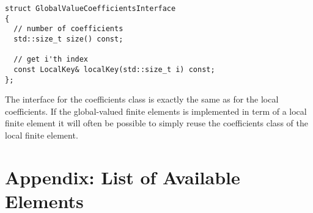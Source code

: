\documentclass[a4paper,11pt]{article}
\begin{document}
\begin{lstlisting}
struct GlobalValueCoefficientsInterface
{
  // number of coefficients
  std::size_t size() const;

  // get i'th index
  const LocalKey& localKey(std::size_t i) const;
};
\end{lstlisting}
The interface for the coefficients class is exactly the same as for the local
coefficients.  If the global-valued finite elements is implemented in term of
a local finite element it will often be possible to simply reuse the
coefficients class of the local finite element.

\section{Appendix: List of Available Elements}



%
%
\end{document}
